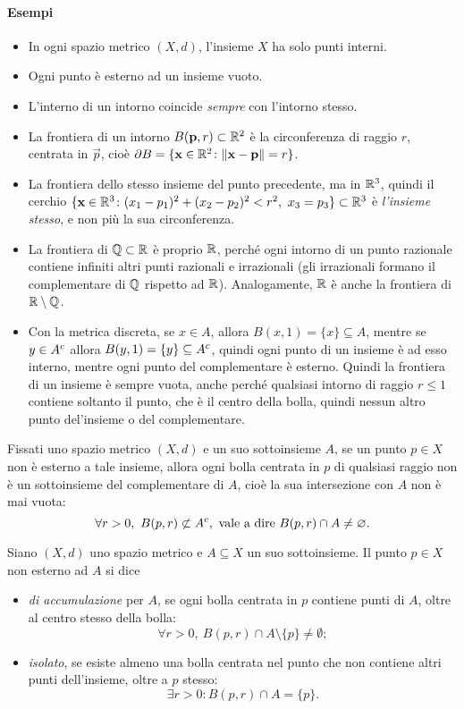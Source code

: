 \paragraph{Esempi}
\begin{itemize}
\item In ogni spazio metrico $(X,d)$, l'insieme $X$ ha solo punti interni.
\item Ogni punto è esterno ad un insieme vuoto.
\item L'interno di un intorno coincide \emph{sempre} con l'intorno stesso.
\item La frontiera di un intorno $B(\mathbf{p},r)\subset\mathbb{R}^2$ è la circonferenza di raggio $r$, centrata in $\vec p$, cioè $\partial B=\{\mathbf{x}\in\mathbb{R}^2\colon\lVert\mathbf{x}-\mathbf{p}\rVert=r\}$.
\item La frontiera dello stesso insieme del punto precedente, ma in $\mathbb{R}^3$, quindi il cerchio $\{\vec x\in\R^3\colon(x_1-p_1)^2+(x_2-p_2)^2<r^2,\ x_3=p_3\}\subset\R^3$ è \emph{l'insieme stesso}, e non più la sua circonferenza.
\item La frontiera di $\mathbb{Q}\subset\mathbb{R}$ è proprio $\mathbb{R}$, perché ogni intorno di un punto razionale contiene infiniti altri punti razionali e irrazionali (gli irrazionali formano il complementare di $\mathbb{Q}$ rispetto ad $\mathbb{R}$). Analogamente, $\mathbb{R}$ è anche la frontiera di $\mathbb{R}\setminus\mathbb{Q}$.
\item Con la metrica discreta, se $x\in A$, allora $B(x,1)=\{x\}\subseteq A$, mentre se $y\in{A}^c$ allora $B(y,1)=\{y\}\subseteq{A}^c$, quindi ogni punto di un insieme è ad esso interno, mentre ogni punto del complementare è esterno. Quindi la frontiera di un insieme è sempre vuota, anche perché qualsiasi intorno di raggio $r\leq 1$ contiene soltanto il punto, che è il centro della bolla, quindi nessun altro punto del'insieme o del complementare.
\end{itemize}
\begin{osservazione}
Fissati uno spazio metrico $(X,d)$ e un suo sottoinsieme $A$, se un punto $p\in X$ non è esterno a tale insieme, allora ogni bolla centrata in $p$ di qualsiasi raggio non è un sottoinsieme del complementare di $A$, cioè la sua intersezione con $A$ non è mai vuota:
\[
	\forall r>0,\ B(p,r)\not\subset\compl{A},\text{ vale a dire }B(p,r)\cap A\neq\emptyset.
\]
\end{osservazione}
\begin{definizione}
Siano $(X,d)$ uno spazio metrico e $A\subseteq X$ un suo sottoinsieme. Il punto $p\in X$ non esterno ad $A$ si dice
\begin{itemize}
\item \emph{di accumulazione} per $A$, se ogni bolla centrata in $p$ contiene punti di $A$, oltre al centro stesso della bolla:
\[
\forall r>0,\ B(p,r)\cap A\setminus\{p\}\neq\emptyset;
\]
\item \emph{isolato}, se esiste almeno una bolla centrata nel punto che non contiene altri punti dell'insieme, oltre a $p$ stesso:
\[
\exists r>0\colon B(p,r)\cap A=\{p\}.%
\]
\end{itemize}
\end{definizione}
